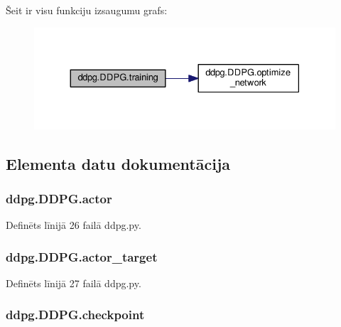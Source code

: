 Šeit ir visu funkciju izsaugumu grafs\+:
\nopagebreak
\begin{figure}[H]
\begin{center}
\leavevmode
\includegraphics[width=330pt]{classddpg_1_1_d_d_p_g_a5237a908e38e5ac76c6b733fc61aeb3d_cgraph}
\end{center}
\end{figure}




\subsection{Elementa datu dokumentācija}
\subsubsection[{\texorpdfstring{actor}{actor}}]{\setlength{\rightskip}{0pt plus 5cm}ddpg.\+D\+D\+P\+G.\+actor}\hypertarget{classddpg_1_1_d_d_p_g_ae6f6b492a3680ece32923bb5f145011f}{}\label{classddpg_1_1_d_d_p_g_ae6f6b492a3680ece32923bb5f145011f}


Definēts līnijā 26 failā ddpg.\+py.

\subsubsection[{\texorpdfstring{actor\+\_\+target}{actor_target}}]{\setlength{\rightskip}{0pt plus 5cm}ddpg.\+D\+D\+P\+G.\+actor\+\_\+target}\hypertarget{classddpg_1_1_d_d_p_g_a8b144476a564ad7483fc276939d27f31}{}\label{classddpg_1_1_d_d_p_g_a8b144476a564ad7483fc276939d27f31}


Definēts līnijā 27 failā ddpg.\+py.

\subsubsection[{\texorpdfstring{checkpoint}{checkpoint}}]{\setlength{\rightskip}{0pt plus 5cm}ddpg.\+D\+D\+P\+G.\+checkpoint}\hypertarget{classddpg_1_1_d_d_p_g_a9e0f7ad3975f13452b47eb0a3c5194c7}{}\label{classddpg_1_1_d_d_p_g_a9e0f7ad3975f13452b47eb0a3c5194c7}


